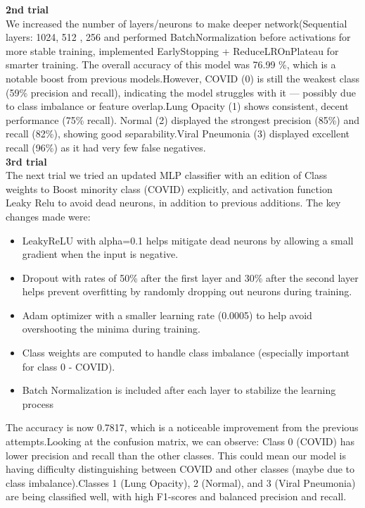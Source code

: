 \documentclass{article}
\begin{document}
\textbf{2nd trial }\\
We increased the number of layers/neurons to make deeper network(Sequential layers: 1024, 512 , 256
and performed BatchNormalization before activations for more stable training, implemented EarlyStopping + ReduceLROnPlateau for smarter training.
The overall accuracy of this model was 76.99 \%, which is a notable boost from previous models.However, COVID (0) is still the weakest class (59\% precision and recall), indicating the model struggles with it — possibly due to class imbalance or feature overlap.Lung Opacity (1) shows consistent, decent performance (75\% recall). Normal (2) displayed the strongest precision (85\%) and recall (82\%), showing good separability.Viral Pneumonia (3) displayed excellent recall (96\%) as it had very few false negatives.\\

\textbf{3rd trial }\\
The next trial  we tried an updated MLP classifier with an edition of Class weights to Boost minority class (COVID) explicitly, and activation function Leaky Relu to avoid dead neurons, in addition to previous additions. The key changes made were:
 \begin{itemize}
     \item LeakyReLU with alpha=0.1 helps mitigate dead neurons by allowing a small gradient when the input is negative.
     \item Dropout with rates of 50\% after the first layer and 30\% after the second layer helps prevent overfitting by randomly dropping out neurons during training.
     \item Adam optimizer with a smaller learning rate (0.0005) to help avoid overshooting the minima during training.
     \item Class weights are computed to handle class imbalance (especially important for class 0 - COVID).
     \item Batch Normalization is included after each layer to stabilize the learning process
\end{itemize}
The accuracy is now 0.7817, which is a noticeable improvement from the previous attempts.Looking at the confusion matrix, we can observe: Class 0 (COVID) has lower precision and recall than the other classes. This could mean our model is having difficulty distinguishing between COVID and other classes (maybe due to class imbalance).Classes 1 (Lung Opacity), 2 (Normal), and 3 (Viral Pneumonia) are being classified well, with high F1-scores and balanced precision and recall.\\
\end{document}
